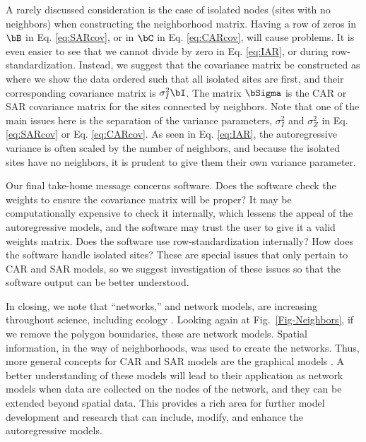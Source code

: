 A rarely discussed consideration is the case of isolated nodes (sites with no neighbors) when constructing the neighborhood matrix.  Having a row of zeros in $\bB$ in Eq. \ref{eq:SARcov}, or in $\bC$ in Eq. \ref{eq:CARcov}, will cause problems.  It is even easier to see that we cannot divide by zero in Eq. \ref{eq:IAR}, or during row-standardization.  Instead, we suggest that the covariance matrix be constructed as
where we show the data ordered such that all isolated sites are first, and their corresponding covariance matrix is $\sigma^2_I\bI$.  The matrix $\bSigma$ is the CAR or SAR covariance matrix for the sites connected by neighbors.  Note that one of the main issues here is the separation of the variance parameters, $\sigma^2_I$ and $\sigma^2_Z$ in Eq. \ref{eq:SARcov} or Eq. \ref{eq:CARcov}.  As seen in Eq. \ref{eq:IAR}, the autoregressive variance is often scaled by the number of neighbors, and because the isolated sites have no neighbors, it is prudent to give them their own variance parameter. 

Our final take-home message concerns software. Does the software check the weights to ensure the covariance matrix will be proper?  It may be computationally expensive to check it internally, which lessens the appeal of the autoregressive models, and the software may trust the user to give it a valid weights matrix. Does the software use row-standardization internally?  How does the software handle isolated sites?  These are special issues that only pertain to CAR and SAR models, so we suggest investigation of these issues so that the software output can be better understood.

In closing, we note that ``networks,'' and network models, are increasing throughout science, including ecology \citep{Borr:Mood:Edel:rise:2014}.  Looking again at Fig.~\ref{Fig-Neighbors}, if we remove the polygon boundaries, these are network models.  Spatial information, in the way of neighborhoods, was used to create the networks.  Thus, more general concepts for CAR and SAR models are the graphical models \citep{Laur:grap:1996, Whit:grap:2009}.  A better understanding of these models will lead to their application as network models when data are collected on the nodes of the network, and they can be extended beyond spatial data. This provides a rich area for further model development and research that can include, modify, and enhance the autoregressive models.



